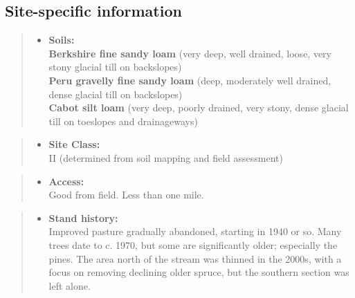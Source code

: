 \documentclass[]{tufte-handout}
\providecommand{\tightlist}{%
  \setlength{\itemsep}{0pt}\setlength{\parskip}{0pt}}
\begin{document}
\subsection{Site-specific
information}\label{site-specific-information-4}

\begin{quote}
\begin{itemize}
\tightlist
\item
  \textbf{Soils:}\\
  \indent\indent  \textbf{Berkshire fine sandy loam} (very deep, well
  drained, loose, very stony glacial till on backslopes)\\
  \textbf{Peru gravelly fine sandy loam} (deep, moderately well drained,
  dense glacial till on backslopes)\\
  \textbf{Cabot silt loam} (very deep, poorly drained, very stony, dense
  glacial till on toeslopes and drainageways)
\end{itemize}
\end{quote}

\begin{quote}
\begin{itemize}
\tightlist
\item
  \textbf{Site Class:}\\
  \vspace{2pt} II (determined from soil mapping and field assessment)
\end{itemize}
\end{quote}

\begin{quote}
\begin{itemize}
\tightlist
\item
  \textbf{Access:}\\
  \vspace{2pt} Good from field. Less than one mile.
\end{itemize}
\end{quote}

\begin{quote}
\begin{itemize}
\tightlist
\item
  \textbf{Stand history:}\\
  \vspace{2pt} Improved pasture gradually abandoned, starting in 1940 or
  so. Many trees date to c. 1970, but some are significantly older;
  especially the pines. The area north of the stream was thinned in the
  2000s, with a focus on removing declining older spruce, but the
  southern section was left alone.
\end{itemize}
\end{quote}
\end{document}
